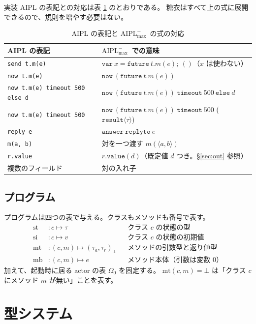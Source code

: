 \documentclass[11pt,a4paper]{ltjsarticle}
\theoremstyle{definition}
\theoremstyle{remark}
\newcommand{\tres}[1]{\ensuremath{\mathtt{result}\langle #1 \rangle}}
\newcommand{\Om}{\Omega}
\newcommand{\styp}{\mathrm{st}}
\newcommand{\mtab}{\mathrm{mt}}
\newcommand{\mbody}{\mathrm{mb}}
\newcommand{\sinit}{\mathrm{si}}
\newcommand{\Amax}{\ensuremath{\mathrm{AIPL}^{-}_{\max}}}
\begin{document}
実装 AIPL の表記との対応は表 \ref{tab:sugar} のとおりである。
糖衣はすべて上の式に展開できるので、規則を増やす必要はない。

\begin{table}[htbp]
\centering
\caption{AIPL の表記と \Amax\ の式の対応}
\label{tab:sugar}
\small
\begin{tabular}{ll}
\toprule
AIPL の表記 & \Amax\ での意味 \\
\midrule
\texttt{send t.m(e)} & $\mathtt{var}\ x = \mathtt{future}\ t.m(e);\ ()$（$x$ は使わない）\\
\texttt{now t.m(e)}  & $\mathtt{now}\ (\mathtt{future}\ t.m(e))$ \\
\texttt{now t.m(e) timeout 500 else d} & $\mathtt{now}\ (\mathtt{future}\ t.m(e))\ \mathtt{timeout}\ 500\ \mathtt{else}\ d$ \\
\texttt{now t.m(e) timeout 500} & $\mathtt{now}\ (\mathtt{future}\ t.m(e))\ \mathtt{timeout}\ 500$ \quad(\tres{\tau}) \\
\texttt{reply e} & $\mathtt{answer}\ \mathtt{replyto}\ e$ \\
\texttt{m(a, b)}  & 対を一つ渡す $m(\langle a,b\rangle)$ \\
\texttt{r.value} & $r.\mathtt{value}(d)$（既定値 $d$ つき。\S\ref{sec:out} 参照）\\
複数のフィールド & 対の入れ子 \\
\bottomrule
\end{tabular}
\end{table}

\subsection{プログラム}

プログラムは四つの表で与える。クラスもメソッドも番号で表す。
\begin{align*}
\styp &: c \mapsto \tau && \text{クラス $c$ の状態の型}\\
\sinit &: c \mapsto v && \text{クラス $c$ の状態の初期値}\\
\mtab &: (c, m) \mapsto (\tau_a, \tau_r)_\bot && \text{メソッドの引数型と返り値型}\\
\mbody &: (c, m) \mapsto e && \text{メソッド本体（引数は変数 $0$）}
\end{align*}
加えて、起動時に居る actor の表 $\Om_0$ を固定する。
$\mtab(c,m) = \bot$ は「クラス $c$ にメソッド $m$ が無い」ことを表す。

\section{型システム}
\end{document}
